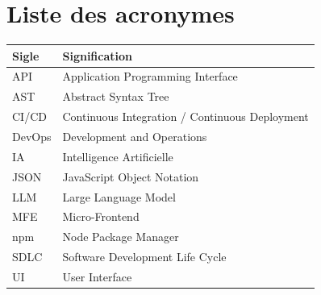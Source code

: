 \chapter*{Liste des acronymes}

\vspace{0.5cm}

\begin{center}
\renewcommand{\arraystretch}{1.5}
\begin{tabular}{|p{3cm}|p{11cm}|}
\hline
\textbf{Sigle} & \textbf{Signification} \\
\hline
API     & Application Programming Interface \\
\hline
AST     & Abstract Syntax Tree \\
\hline
CI/CD   & Continuous Integration / Continuous Deployment \\
\hline
DevOps  & Development and Operations \\
\hline
IA      & Intelligence Artificielle \\
\hline
JSON    & JavaScript Object Notation \\
\hline
LLM     & Large Language Model \\
\hline
MFE     & Micro-Frontend \\
\hline
npm     & Node Package Manager \\
\hline
SDLC    & Software Development Life Cycle \\
\hline
UI      & User Interface \\
\hline
\end{tabular}
\end{center}

